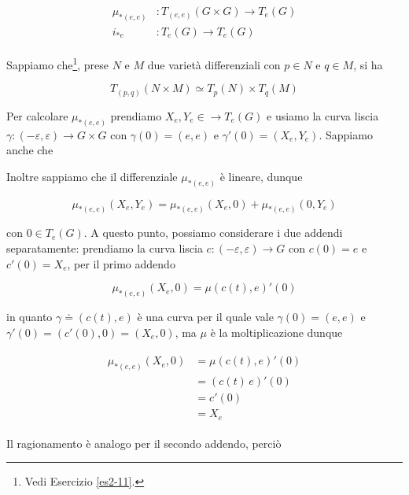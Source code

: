 \begin{align}
	\begin{split}
		\mu_{*(e,e)} &: T_{(e,e)}(G \times G) \to T_{e}(G)\\
		i_{*e} &: T_{e}(G) \to T_{e}(G)
	\end{split}
\end{align}

Sappiamo che\footnote{%
	Vedi Esercizio \ref{es2-11}.%
}, prese $ N $ e $ M $ due varietà differenziali con $ p \in N $ e $ q \in M $, si ha

\begin{equation}
	T_{(p,q)}(N \times M) \simeq T_{p}(N) \times T_{q}(M)
\end{equation}

Per calcolare $ \mu_{*(e,e)} $ prendiamo $ X_{e},Y_{e} \in \to T_{e}(G) $ e usiamo la curva liscia $ \gamma : (-\varepsilon,\varepsilon) \to G \times G $ con $ \gamma(0)=(e,e) $ e $ \gamma'(0) = (X_{e},Y_{e}) $. Sappiamo anche che

Inoltre sappiamo che il differenziale $ \mu_{*(e,e)} $ è lineare, dunque

\begin{equation}
	\mu_{*(e,e)}(X_{e},Y_{e}) = \mu_{*(e,e)}(X_{e},0) + \mu_{*(e,e)}(0,Y_{e})
\end{equation}

con $ 0 \in T_{e}(G) $. A questo punto, possiamo considerare i due addendi separatamente: prendiamo la curva liscia $ c : (-\varepsilon,\varepsilon) \to G $ con $ c(0)=e $ e $ c'(0) = X_{e} $, per il primo addendo

\begin{equation}
	\mu_{*(e,e)}(X_{e},0) = \mu(c(t),e)'(0)
\end{equation}

in quanto $ \gamma \doteq (c(t),e) $ è una curva per il quale vale $ \gamma(0) = (e,e) $ e $ \gamma'(0) = (c'(0),0) = (X_{e},0) $, ma $ \mu $ è la moltiplicazione dunque

\begin{align}
	\begin{split}
		\mu_{*(e,e)}(X_{e},0) &= \mu(c(t),e)'(0)\\
		&= (c(t) \, e)'(0)\\
		&= c'(0)\\
		&= X_{e}
	\end{split}
\end{align}

Il ragionamento è analogo per il secondo addendo, perciò

